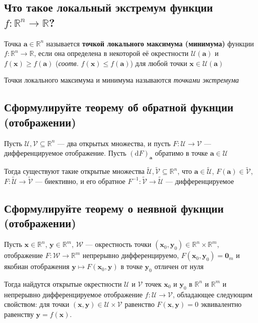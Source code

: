 \documentclass[a4paper]{article}
\newcommand{\m}[1]{\mathbf{#1}}
\begin{document}
\subsection{Что такое локальный экстремум функции $f:\mathbb{R}^n\to\mathbb{R}$?}
Точка $\m{a} \in \mathbb{R}^n$ называется \textbf{точкой локального максимума (минимума)} функции $f:\mathbb{R}^n \to \mathbb{R}$, если она определена в некоторой её окрестности $\mathscr{U}(\m{a})$ и $f(\m{x}) \ge f(\m{a})$ (\textit{соотв.} $f(\m{x}) \le f(\m{a})$) для любой точки $\m{x} \in \mathscr{U}(\m{a})$

Точки локального максимума и минимума называются \textit{точками экстремума}


\subsection{Сформулируйте теорему об обратной фукнции (отображении)}
Пусть $\mathscr{U}, \mathscr{V} \subseteq \mathbb{R}^n$ — два открытых множества, и пусть $F:\mathscr{U} \to \mathscr{V}$ — дифференцируемое отображение. Пусть $(\mathrm{d}F)_\m{a}$ обратимо в точке $\m{a} \in \mathscr{U}$
\label{1.10}

Тогда существуют такие открытые множества $\widetilde{\mathscr{U}}, \widetilde{\mathscr{V}} \subseteq \mathbb{R}^n$, что $\m{a} \in \widetilde{\mathscr{U}}$, $F(\m{a}) \in \widetilde{\mathscr{V}}$, $ F: \widetilde{\mathscr{U}} \to \widetilde{\mathscr{V}}$ — биективно, и его обратное $F^{-1}:\widetilde{\mathscr{V}} \to \widetilde{\mathscr{U}}$ — дифференцируемое

\subsection{Сформулируйте теорему о неявной фукнции (отображении)}
Пусть $\m{x} \in \mathbb{R}^n$, $\m{y} \in \mathbb{R}^m$, $\mathscr{W}$ — окрестность точки $(\m{x}_0, \m{y}_0) \in \mathbb{R}^n \times \mathbb{R}^m$, отображение $F: \mathscr{W} \to \mathbb{R}^m$ непрерывно дифференцируемо, $F(\m{x}_0, \m{y}_0) = \m{0}_m$ и якобиан отображения $\m{y}\mapsto F(\m{x}_0, \m{y})$ в точке $\m{y}_0$ отличен от нуля

Тогда найдутся открытые окрестности $\mathscr{U}$ и $\mathscr{V}$ точек $\m{x}_0$ и $\m{y}_0$ в $\mathbb{R}^n$ и $\mathbb{R}^m$ и непрерывно дифференцируемое отображение $f: \mathscr{U} \to \mathscr{V}$, обладающее следующим свойством: для точки $(\m{x}, \m{y}) \in \mathscr{U} \times \mathscr{V}$ равенство $F(\m{x}, \m{y}) = 0$ эквивалентно равенству $\m{y} = f(\m{x}).$
\end{document}
